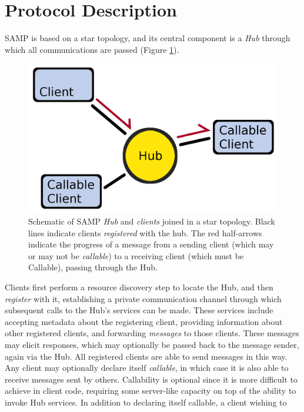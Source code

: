 \documentclass[5p]{elsarticle}
\begin{document}
\section{Protocol Description} \label{sec:protocol}

SAMP is based on a star topology, and its central component is a
{\em Hub\/} through which all communications are passed
(Figure \ref{fig:topology}).
\begin{figure}
\begin{center}
\includegraphics[width=0.9\columnwidth]{topology-a.png}
\end{center}
\caption{\label{fig:topology}
Schematic of SAMP {\em Hub\/} and {\em clients\/} joined in a star topology.
Black lines indicate clients {\em registered\/} with the hub.
The red half-arrows indicate the progress of a message
from a sending client (which may or may not be {\em callable\/})
to a receiving client (which must be Callable),
passing through the Hub.
}
\end{figure}
Clients first perform a resource discovery step to locate the Hub,
and then {\em register\/} with it, establishing a private communication
channel through which subsequent calls to the Hub's services can be made.
These services include accepting metadata about the registering client,
providing information about other registered clients,
and forwarding {\em messages\/} to those clients.
These messages may elicit responses, which may optionally be passed
back to the message sender, again via the Hub.
All registered clients are able to send messages in this way.
Any client may optionally declare itself {\em callable\/},
in which case it is also able to receive messages sent by others.
Callability is optional since it is more difficult to
achieve in client code, requiring some server-like capacity
on top of the ability to invoke Hub services.
In addition to declaring itself callable, a client wishing to
\end{document}
